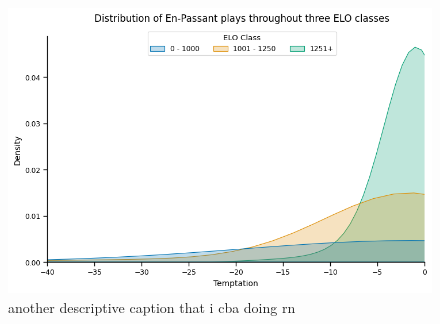\documentclass[10pt,a4paper,twocolumn]{article}
\begin{document}
\begin{figure}[t]
  \centering
  \includegraphics{report/images/ep_distplot.png}
  \caption{another descriptive caption that i cba doing rn}
  \label{fds-project-template:fig:ep_distplot}
\end{figure}


\end{document}

